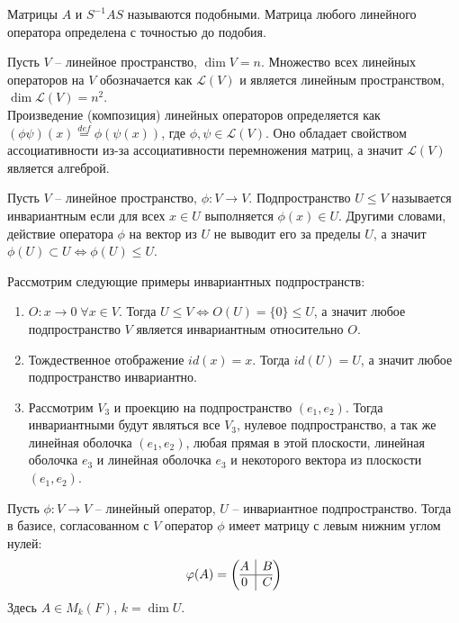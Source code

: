 \begin{note}
    Матрицы $A$ и $S^{-1} A S$ называются подобными. Матрица любого линейного оператора 
    определена с точностью до подобия.
\end{note}

\begin{reminder}
    Пусть $V$ -- линейное пространство, $\dim V = n$. Множество всех линейных 
    операторов на $V$ обозначается как $\mathcal{L}(V)$ и является линейным пространством, 
    $\dim \mathcal{L}(V) = n^2$. \\
    Произведение (композиция) линейных операторов определяется как 
    $(\phi \psi)(x) \stackrel{def}{=} \phi(\psi(x))$, где $\phi, \psi \in \mathcal{L}(V)$. 
    Оно обладает свойством ассоциативности из-за ассоциативности перемножения матриц, а значит 
    $\mathcal{L}(V)$ является алгеброй.
\end{reminder}

\begin{definition}
    Пусть $V$ -- линейное пространство, $\phi: V \to V$. Подпространство $U \leq V$ называется 
    инвариантным если для всех $x \in U$ выполняется $\phi(x) \in U$. Другими словами, действие 
    оператора $\phi$ на вектор из $U$ не выводит его за пределы $U$, а значит 
    $\phi(U) \subset U \Leftrightarrow \phi(U) \leq U$.
\end{definition}

\begin{example}
    Рассмотрим следующие примеры инвариантных подпространств:
    \begin{enumerate}
        \item $O: x \to 0 \; \forall x \in V$. Тогда $U \leq V \Leftrightarrow O(U) = \{0\} \leq U$, 
            а значит любое подпространство $V$ является инвариантным относительно $O$.
        \item Тождественное отображение $id(x) = x$. Тогда $id(U) = U$, 
            а значит любое подпространство инвариантно.
        \item Рассмотрим $V_3$ и проекцию на подпространство $(e_1, e_2)$. Тогда инвариантными будут 
            являться все $V_3$, нулевое подпространство, а так же линейная оболочка $(e_1, e_2)$, 
            любая прямая в этой плоскости, линейная оболочка $e_3$ и линейная оболочка $e_3$
            и некоторого вектора из плоскости $(e_1, e_2)$.
    \end{enumerate}
\end{example}

\begin{proposition}
    Пусть $\phi: V \to V$ -- линейный оператор, $U$ -- инвариантное подпространство. Тогда в базисе, 
    согласованном с $V$ оператор $\phi$ имеет матрицу с левым нижним углом нулей:
    \[\phi(A) = \left(\begin{array}{@{}c|c@{}}
		A & B\\
		\hline
		0 & C
	\end{array}\right)\]
    Здесь $A \in M_k(F)$, $k = \dim U$.
\end{proposition}

